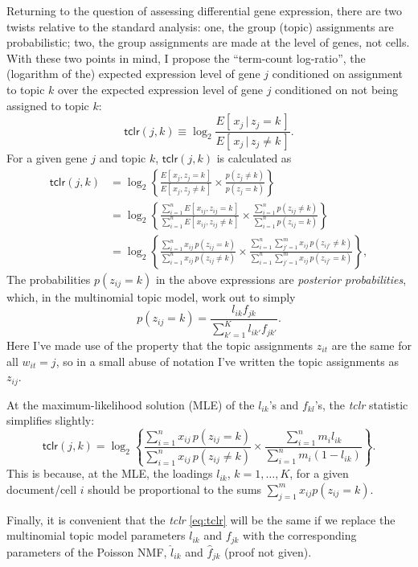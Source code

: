 \documentclass[final]{siamart171218}
\begin{document}
Returning to the question of assessing differential gene expression,
there are two twists relative to the standard analysis: one, the group
(topic) assignments are probabilistic; two, the group assignments are
made at the level of genes, not cells. With these two points in mind,
I propose the ``term-count log-ratio'', the (logarithm of the)
expected expression level of gene $j$ conditioned on assignment to
topic $k$ over the expected expression level of gene $j$ conditioned
on not being assigned to topic $k$:
\begin{equation}
\mathsf{tclr}(j,k) \equiv
\log_2 \frac{E[\,x_j \,|\, z_j = k\,]}{E[\,x_j \,|\, z_j \neq k\,]}.
\end{equation}
For a given gene $j$ and topic $k$, $\mathsf{tclr}(j,k)$ is calculated
as
\begin{align}
\mathsf{tclr}(j,k) &=
\log_2 \left\{ \frac{E[\, x_j, z_j = k \,]}{E[\, x_j, z_j \neq k\,]} \times
\frac{p(z_j \neq k)}{p(z_j = k)} \right\} \nonumber \\
&= \log_2 \left\{ \frac{\sum_{i=1}^n E[\, x_{ij}, z_{ij} = k \,]}
                       {\sum_{i=1}^n E[\, x_{ij}, z_{ij} \neq k\,]} \times
                  \frac{\sum_{i=1}^n p(z_{ij} \neq k)}
                       {\sum_{i=1}^n p(z_{ij} = k)} \right\} \nonumber \\
&= \log_2 \left\{ \frac{\sum_{i=1}^n x_{ij} \, p(z_{ij} = k)}
                       {\sum_{i=1}^n x_{ij} \, p(z_{ij} \neq k)} \times
                  \frac{\sum_{i=1}^n \sum_{j'=1}^m x_{ij} \, p(z_{ij'} \neq k)}
                       {\sum_{i=1}^n \sum_{j'=1}^m x_{ij} \, p(z_{ij'} = k)}
                  \right\},
\label{eq:tclr}
\end{align}
The probabilities $p(z_{ij} = k)$ in the above expressions are {\em
posterior probabilities}, which, in the multinomial topic model,
work out to simply
\begin{equation}
p(z_{ij} = k) = \frac{l_{ik} f_{jk}}{\sum_{k'=1}^K l_{ik'} f_{jk'}}.
\end{equation}
Here I've made use of the property that the topic assignments $z_{it}$
are the same for all $w_{it} = j$, so in a small abuse of notation
I've written the topic assignments as $z_{ij}$.

At the maximum-likelihood solution (MLE) of the $l_{ik}$'s and $f_{kl}$'s,
the {\em tclr} statistic simplifies slightly:
\begin{equation}
\mathsf{tclr}(j,k) = \log_2 \left\{ \frac{\sum_{i=1}^n x_{ij} \, p(z_{ij} = k)}
                       {\sum_{i=1}^n x_{ij} \, p(z_{ij} \neq k)} \times
                  \frac{\sum_{i=1}^n m_i l_{ik}}
                       {\sum_{i=1}^n m_i (1 - l_{ik})}
                  \right\}.
\end{equation}
This is because, at the MLE, the loadings $l_{ik}$, $k = 1, \ldots,
K$, for a given document/cell $i$ should be proportional to the sums
$\sum_{j=1}^m x_{ij} p(z_{ij} = k)$.

Finally, it is convenient that the {\em tclr} \eqref{eq:tclr} will be
the same if we replace the multinomial topic model parameters $l_{ik}$
and $f_{jk}$ with the corresponding parameters of the Poisson NMF,
$\hat{l}_{ik}$ and $\hat{f}_{jk}$ (proof not given).



\end{document}
